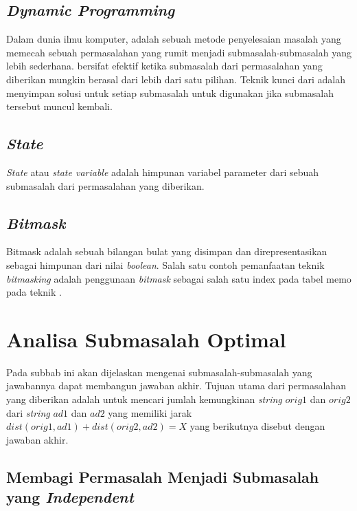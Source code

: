 \subsection{\textit{Dynamic Programming}}
\label{subsec:dynamic_programming}
Dalam dunia ilmu komputer, \dynamicprogramming{} adalah sebuah metode penyelesaian masalah yang memecah sebuah permasalahan yang rumit menjadi submasalah-submasalah yang lebih sederhana. \dynamicprogramming{} bersifat efektif ketika submasalah dari permasalahan yang diberikan mungkin berasal dari lebih dari satu pilihan. Teknik kunci dari \dynamicprogramming{} adalah menyimpan solusi untuk setiap submasalah untuk digunakan jika submasalah tersebut muncul kembali\cite{cormen}.

\subsection{\textit{State}}
\label{subsec:state}
\textit{State} atau \textit{state variable} adalah himpunan variabel parameter dari sebuah submasalah dari permasalahan yang diberikan\cite{state}.

\subsection{\textit{Bitmask}}
\label{subsec:bitmask}
Bitmask adalah sebuah bilangan bulat yang disimpan dan direpresentasikan sebagai himpunan dari nilai \textit{boolean}. Salah satu contoh pemanfaatan teknik \textit{bitmasking} adalah penggunaan \textit{bitmask} sebagai salah satu index pada tabel memo pada teknik \dynamicprogramming{}\cite{cp3}.

\section{Analisa Submasalah Optimal}
\label{sec: analisa_submasalah_optimal}
Pada subbab ini akan dijelaskan mengenai submasalah-submasalah yang jawabannya dapat membangun jawaban akhir. Tujuan utama dari permasalahan yang diberikan adalah untuk mencari jumlah kemungkinan \textit{string} $orig1$ dan $orig2$ dari \textit{string} $ad1$ dan $ad2$ yang memiliki jarak $dist(orig1, ad1) + dist(orig2, ad2) = X$ yang berikutnya disebut dengan jawaban akhir. 

\subsection{Membagi Permasalah Menjadi Submasalah yang \textit{Independent}} \label{subsec:membagi_permasalahan_menjadi_dua_submasalah_yang_independent}

